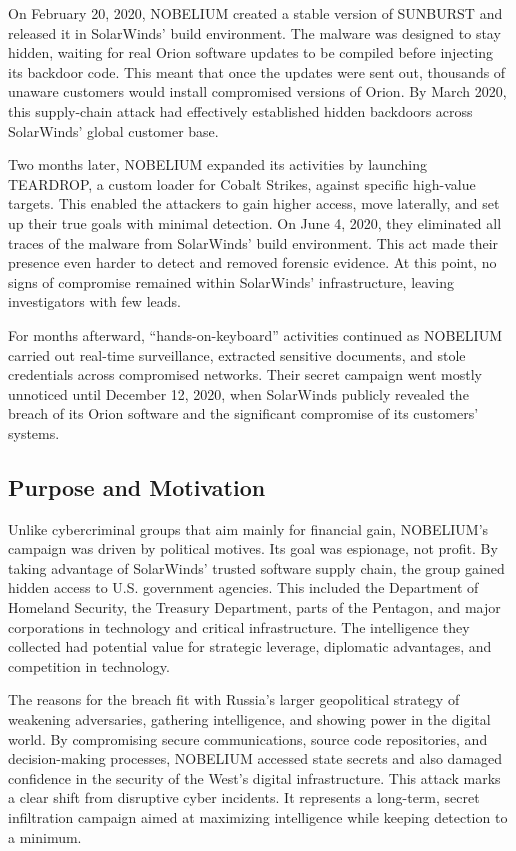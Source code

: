 \documentclass[conference]{IEEEtran}
\begin{document}
On February 20, 2020, NOBELIUM created a stable version of SUNBURST and released it in SolarWinds’ build environment. The malware was designed 
to stay hidden, waiting for real Orion software updates to be compiled before injecting its backdoor code. This meant that once the updates were 
sent out, thousands of unaware customers would install compromised versions of Orion. By March 2020, this supply-chain attack had effectively 
established hidden backdoors across SolarWinds’ global customer base.\cite{MicrosoftDeepDiveSOLORIGATE}

Two months later, NOBELIUM expanded its activities by launching TEARDROP, a custom loader for Cobalt Strikes, against specific high-value targets. 
This enabled the attackers to gain higher access, move laterally, and set up their true goals with minimal detection. On June 4, 2020, they eliminated 
all traces of the malware from SolarWinds’ build environment. This act made their presence even harder to detect and removed forensic evidence. At this 
point, no signs of compromise remained within SolarWinds’ infrastructure, leaving investigators with few leads.\cite{MicrosoftDeepDiveSOLORIGATE}

For months afterward, “hands-on-keyboard” activities continued as NOBELIUM carried out real-time surveillance, extracted sensitive documents, and stole 
credentials across compromised networks. Their secret campaign went mostly unnoticed until December 12, 2020, when SolarWinds publicly revealed the 
breach of its Orion software and the significant compromise of its customers’ systems.\cite{MicrosoftDeepDiveSOLORIGATE}



\subsection{Purpose and Motivation}
Unlike cybercriminal groups that aim mainly for financial gain, NOBELIUM's campaign was driven by political motives. 
Its goal was espionage, not profit. By taking advantage of SolarWinds' trusted software supply chain, the group gained hidden access to U.S. 
government agencies. This included the Department of Homeland Security, the Treasury Department, parts of the Pentagon, and major corporations 
in technology and critical infrastructure. The intelligence they collected had potential value for strategic leverage, diplomatic advantages, 
and competition in technology.

The reasons for the breach fit with Russia's larger geopolitical strategy of weakening adversaries, gathering intelligence, and showing power 
in the digital world. By compromising secure communications, source code repositories, and decision-making processes, NOBELIUM accessed state 
secrets and also damaged confidence in the security of the West’s digital infrastructure. This attack marks a clear shift from disruptive cyber 
incidents. It represents a long-term, secret infiltration campaign aimed at maximizing intelligence while keeping detection to a minimum.
\end{document}
